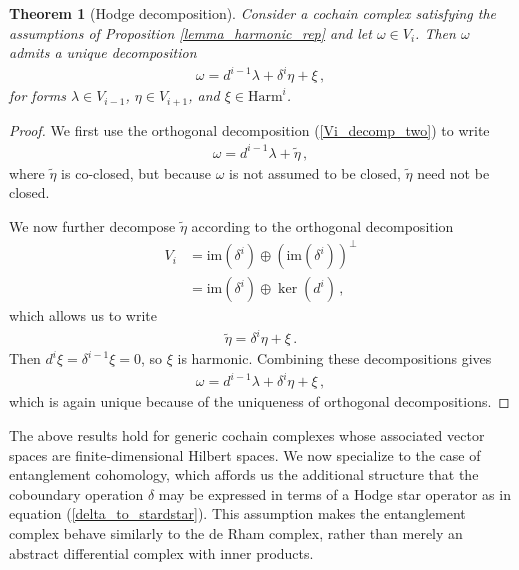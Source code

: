 \documentclass[12pt]{article}
\newtheorem{thm}{Theorem}[section]
\newcommand{\im}{\mathrm{im}}
\numberwithin{equation}{section}
\begin{document}
\begin{thm}[Hodge decomposition]\label{hodge_decomp}
Consider a cochain complex satisfying the assumptions of Proposition \ref{lemma_harmonic_rep} and let $\omega \in V_i$. Then $\omega$ admits a unique decomposition
%
\begin{align}\label{hodge_decomposition}
    \omega = d^{i-1} \lambda + \delta^i \eta + \xi \, ,
\end{align}
%
for forms $\lambda \in V_{i-1}$, $\eta \in V_{i+1}$, and $\xi \in \mathrm{Harm}^i$.
\end{thm}

\begin{proof}
    We first use the orthogonal decomposition (\ref{Vi_decomp_two}) to write
    \begin{align}
        \omega = d^{i-1} \lambda + \widetilde{\eta} \, ,
    \end{align}
    where $\widetilde{\eta}$ is co-closed, but because $\omega$ is not assumed to be closed, $\widetilde{\eta}$ need not be closed.
    
    We now further decompose $\widetilde{\eta}$ according to the orthogonal decomposition
    \begin{align}
        V_i &= \im \left( \delta^{i} \right) \oplus \left( \im \left( \delta^i \right) \right)^\perp \nonumber \\
        &= \im \left( \delta^i \right) \oplus \ker \left( d^i \right) \, ,
    \end{align}
    which allows us to write
    \begin{align}
        \widetilde{\eta} = \delta^i \eta + \xi \, .
    \end{align}
    Then $d^i \xi = \delta^{i-1} \xi = 0$, so $\xi$ is harmonic. Combining these decompositions gives
    \begin{align}
        \omega = d^{i-1} \lambda + \delta^i \eta + \xi \, ,
    \end{align}
    which is again unique because of the uniqueness of orthogonal decompositions.
\end{proof}


The above results hold for generic cochain complexes whose associated vector spaces are finite-dimensional Hilbert spaces. We now specialize to the case of entanglement cohomology, which affords us the additional structure that the coboundary operation $\delta$ may be expressed in terms of a Hodge star operator as in equation (\ref{delta_to_stardstar}). This assumption makes the entanglement complex behave similarly to the de Rham complex, rather than merely an abstract differential complex with inner products.
\end{document}
